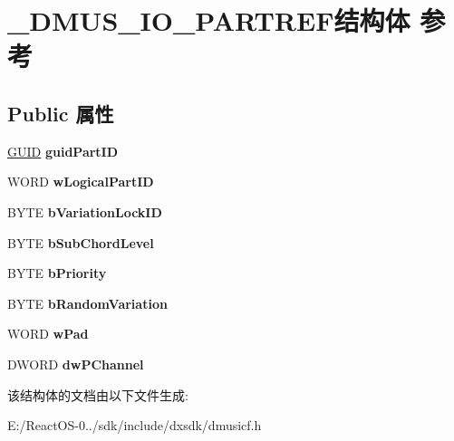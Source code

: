 \hypertarget{struct___d_m_u_s___i_o___p_a_r_t_r_e_f}{}\section{\+\_\+\+D\+M\+U\+S\+\_\+\+I\+O\+\_\+\+P\+A\+R\+T\+R\+E\+F结构体 参考}
\label{struct___d_m_u_s___i_o___p_a_r_t_r_e_f}
\subsection*{Public 属性}
\begin{DoxyCompactItemize}
\item 
\mbox{\label{struct___d_m_u_s___i_o___p_a_r_t_r_e_f_acf3b1e34084ccea3ee5acb92670d9552}} 
\hyperlink{interface_g_u_i_d}{G\+U\+ID} {\bfseries guid\+Part\+ID}
\item 
\mbox{\label{struct___d_m_u_s___i_o___p_a_r_t_r_e_f_a2e601edabd961c458ffec79a3a7e9534}} 
W\+O\+RD {\bfseries w\+Logical\+Part\+ID}
\item 
\mbox{\label{struct___d_m_u_s___i_o___p_a_r_t_r_e_f_ac903676cb90e68c20223b7171914a0e8}} 
B\+Y\+TE {\bfseries b\+Variation\+Lock\+ID}
\item 
\mbox{\label{struct___d_m_u_s___i_o___p_a_r_t_r_e_f_a14433ea78cc0c34c5a69efe853d97280}} 
B\+Y\+TE {\bfseries b\+Sub\+Chord\+Level}
\item 
\mbox{\label{struct___d_m_u_s___i_o___p_a_r_t_r_e_f_a5c3ff83b2edca5ca9dbc95f5dd526bf8}} 
B\+Y\+TE {\bfseries b\+Priority}
\item 
\mbox{\label{struct___d_m_u_s___i_o___p_a_r_t_r_e_f_a62ab175729853dbb69eb5d6480d4cdb3}} 
B\+Y\+TE {\bfseries b\+Random\+Variation}
\item 
\mbox{\label{struct___d_m_u_s___i_o___p_a_r_t_r_e_f_a81c90f2d85259ef92b95101bb0f59e9f}} 
W\+O\+RD {\bfseries w\+Pad}
\item 
\mbox{\label{struct___d_m_u_s___i_o___p_a_r_t_r_e_f_a0196815f05d602b36a9dabe6fdc12345}} 
D\+W\+O\+RD {\bfseries dw\+P\+Channel}
\end{DoxyCompactItemize}


该结构体的文档由以下文件生成\+:\begin{DoxyCompactItemize}
\item 
E\+:/\+React\+O\+S-\/0../sdk/include/dxsdk/dmusicf.\+h\end{DoxyCompactItemize}
